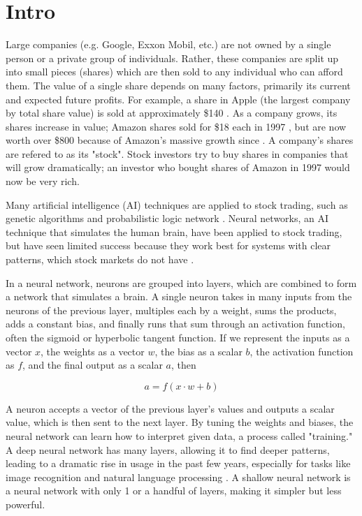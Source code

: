 \documentclass[twocolumn]{article}
\begin{document}
\section{Intro}


Large companies (e.g. Google, Exxon Mobil, etc.) are not owned by a single person or a private group of individuals. Rather, these companies are split up into small pieces (shares) which are then sold to any individual who can afford them. The value of a single share depends on many factors, primarily its current and expected future profits. For example, a share in Apple (the largest company by total share value) is sold at approximately \$140 \cite{yahooapple}. As a company grows, its shares increase in value; Amazon shares sold for \$18 each in 1997 \cite{investopedia}, but are now worth over \$800 because of Amazon's massive growth since \cite{yahooamazon}. A company's shares are refered to as its "stock". Stock investors try to buy shares in companies that will grow dramatically; an investor who bought shares of Amazon in 1997 would now be very rich.

Many artificial intelligence (AI) techniques are applied to stock trading, such as genetic algorithms and probabilistic logic network \cite{wired}. Neural networks, an AI technique that simulates the human brain, have been applied to stock trading, but have seen limited success because they work best for systems with clear patterns, which stock markets do not have \cite{hurwitz}.

In a neural network, neurons are grouped into layers, which are combined to form a network that simulates a brain. A single neuron takes in many inputs from the neurons of the previous layer, multiples each by a weight, sums the products, adds a constant bias, and finally runs that sum through an activation function, often the sigmoid or hyperbolic tangent function. If we represent the inputs as a vector $x$, the weights as a vector $w$, the bias as a scalar $b$, the activation function as $f$, and the final output as a scalar $a$, then

$$a = f ( x \cdot w + b )$$

A neuron accepts a vector of the previous layer's values and outputs a scalar value, which is then sent to the next layer. By tuning the weights and biases, the neural network can learn how to interpret given data, a process called "training." A deep neural network has many layers, allowing it to find deeper patterns, leading to a dramatic rise in usage in the past few years, especially for tasks like image recognition and natural language processing \cite{wired}. A shallow neural network is a neural network with only 1 or a handful of layers, making it simpler but less powerful.
\end{document}

